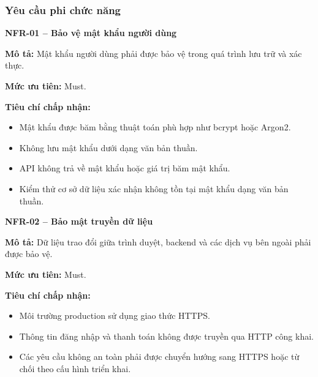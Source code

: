 \documentclass[a4paper]{article}
\begin{document}
\subsubsection{Yêu cầu phi chức năng}

\par\ifdim\dimexpr\pagegoal-\pagetotal\relax<6\baselineskip\newpage\fi
{}

\noindent\textbf{NFR-01 – Bảo vệ mật khẩu người dùng}\par\nopagebreak
\begin{list}{}{%
    \setlength{\leftmargin}{0.8cm}%
    \setlength{\rightmargin}{0pt}%
    \setlength{\labelwidth}{0pt}%
    \setlength{\labelsep}{0pt}%
    \setlength{\itemindent}{0pt}%
    \setlength{\listparindent}{0pt}%
    \setlength{\itemsep}{5pt}%
    \setlength{\parsep}{0pt}%
    \setlength{\topsep}{5pt}%
}
\item[] \textbf{Mô tả:} Mật khẩu người dùng phải được bảo vệ trong quá trình lưu trữ và xác thực.
\item[] \textbf{Mức ưu tiên:} Must.
\item[] \textbf{Tiêu chí chấp nhận:} 
\begin{itemize}
\item Mật khẩu được băm bằng thuật toán phù hợp như bcrypt hoặc Argon2.
\item Không lưu mật khẩu dưới dạng văn bản thuần.
\item API không trả về mật khẩu hoặc giá trị băm mật khẩu.
\item Kiểm thử cơ sở dữ liệu xác nhận không tồn tại mật khẩu dạng văn bản thuần.
\end{itemize}
\end{list}

\par\ifdim\dimexpr\pagegoal-\pagetotal\relax<6\baselineskip\newpage\fi
{}

\noindent\textbf{NFR-02 – Bảo mật truyền dữ liệu}\par\nopagebreak
\begin{list}{}{%
    \setlength{\leftmargin}{0.8cm}%
    \setlength{\rightmargin}{0pt}%
    \setlength{\labelwidth}{0pt}%
    \setlength{\labelsep}{0pt}%
    \setlength{\itemindent}{0pt}%
    \setlength{\listparindent}{0pt}%
    \setlength{\itemsep}{5pt}%
    \setlength{\parsep}{0pt}%
    \setlength{\topsep}{5pt}%
}
\item[] \textbf{Mô tả:} Dữ liệu trao đổi giữa trình duyệt, backend và các dịch vụ bên ngoài phải được bảo vệ.
\item[] \textbf{Mức ưu tiên:} Must.
\item[] \textbf{Tiêu chí chấp nhận:} 
\begin{itemize}
\item Môi trường production sử dụng giao thức HTTPS.
\item Thông tin đăng nhập và thanh toán không được truyền qua HTTP công khai.
\item Các yêu cầu không an toàn phải được chuyển hướng sang HTTPS hoặc từ chối theo cấu hình triển khai.
\end{itemize}
\end{list}
\end{document}
